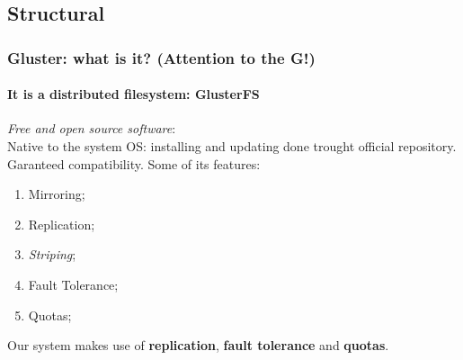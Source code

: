 \documentclass[svgnames,smaller,table]{beamer}
\begin{document}
\subsection{Structural}
\begin{frame}
  \frametitle{Gluster: what is it? (Attention to the G!)}
  \framesubtitle{It is a distributed filesystem: \textbf{GlusterFS}}

\textbullet  \textit{Free and open source software}:\\%
\textbullet  Native to the system OS: installing and updating done trought official repository. Garanteed compatibility.
  \vspace{10px}
  Some of its features:
  \begin{enumerate}
  \item Mirroring;
  \item Replication;
  \item \textit{Striping};
  \item Fault Tolerance;
  \item Quotas;
  \end{enumerate}
  \vspace{10px}
  Our system makes use of \textbf{replication}, \textbf{fault tolerance} and \textbf{quotas}.
\end{frame}


%
\end{document}
